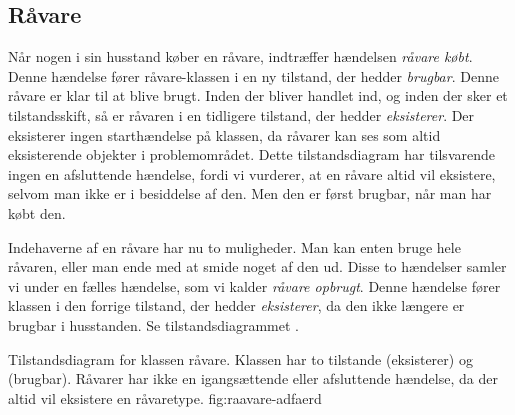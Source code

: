 \subsection{Råvare}
Når nogen i sin husstand køber en råvare, indtræffer hændelsen \textit{råvare købt}. Denne hændelse fører råvare-klassen i en ny tilstand, der hedder \textit{brugbar}. Denne råvare er klar til at blive brugt. Inden der bliver handlet ind, og inden der sker et tilstandsskift, så er råvaren i en tidligere tilstand, der hedder \textit{eksisterer}. Der eksisterer ingen starthændelse på klassen, da råvarer kan ses som altid eksisterende objekter i problemområdet. Dette tilstandsdiagram har tilsvarende ingen en afsluttende hændelse, fordi vi vurderer, at en råvare altid vil eksistere, selvom man ikke er i besiddelse af den. Men den er først brugbar, når man har købt den. 

Indehaverne af en råvare har nu to muligheder. Man kan enten bruge hele råvaren, eller man ende med at smide noget af den ud. Disse to hændelser samler vi  under en fælles hændelse, som vi kalder \textit{råvare opbrugt}. Denne hændelse fører klassen i den forrige tilstand, der hedder \textit{eksisterer}, da den ikke længere er brugbar i husstanden. Se tilstandsdiagrammet .

  {Tilstandsdiagram for klassen råvare. Klassen har to tilstande (eksisterer) og (brugbar). Råvarer har ikke en igangsættende eller afsluttende hændelse, da der altid vil eksistere en råvaretype.}
  {fig:raavare-adfaerd}

